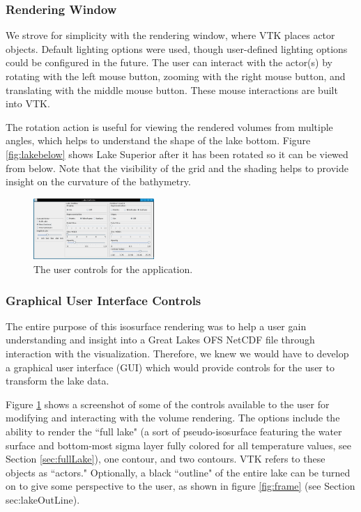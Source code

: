 \documentclass{article} %
\begin{document}
\subsubsection{Rendering Window}

We strove for simplicity with the rendering window, where VTK places actor objects.  Default lighting options were used, though user-defined lighting options could be configured in the future.  The user can interact with the actor(s) by rotating with the left mouse button, zooming with the right mouse button, and translating with the middle mouse button.  These mouse interactions are built into VTK.

The rotation action is useful for viewing the rendered volumes from multiple angles, which helps to understand the shape of the lake bottom.  Figure \ref{fig:lakebelow} shows Lake Superior after it has been rotated so it can be viewed from below.  Note that the visibility of the grid and the shading helps to provide insight on the curvature of the bathymetry.


\begin{figure}
   \centering
   \includegraphics[width=1.8in]{figures/lakecontrols.eps}
    \caption{The user controls for the application.}
   \label{fig:controls}
\end{figure}


\subsubsection{Graphical User Interface Controls}\label{sec:gui}

The entire purpose of this isosurface rendering was to help a user gain understanding and insight into a Great Lakes OFS NetCDF file through interaction with the visualization.  Therefore, we knew we would have to develop a graphical user interface (GUI) which would provide controls for the user to transform the lake data.

Figure \ref{fig:controls} shows a screenshot of some of the controls available to the user for modifying and interacting with the volume rendering.  The options include the ability to render the ``full lake" (a sort of pseudo-isosurface featuring the water surface and bottom-most sigma layer fully colored for all temperature values, see Section \ref{sec:fullLake}), one contour, and two contours.  VTK refers to these objects as ``actors."  Optionally, a black ``outline" of the entire lake can be turned on to give some perspective to the user, as shown in figure \ref{fig:frame} (see Section {sec:lakeOutLine}).
\end{document}
